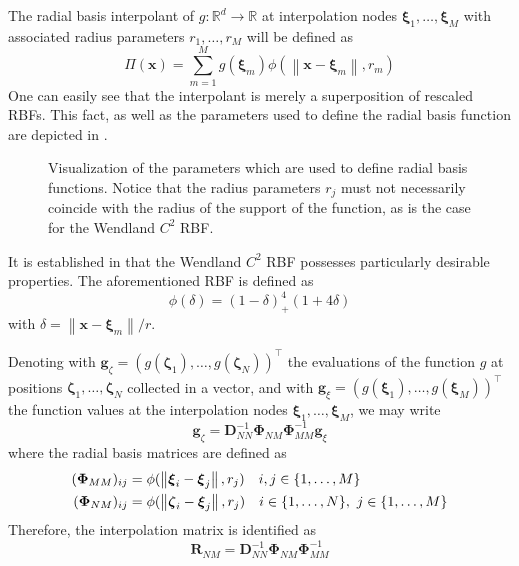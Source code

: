 \documentclass[11pt, a4paper]{article}
\begin{document}
The radial basis interpolant of $g : \mathbb{R}^d \to \mathbb{R}$ at interpolation nodes $\boldsymbol{\xi}_1, \dots, \boldsymbol{\xi}_M$ with associated radius parameters $r_1, \dots, r_M$ will be defined as
\begin{equation}
    \Pi(\mathbf{x}) = \sum_{m=1}^M g(\boldsymbol{\xi}_m) \phi(\left\| \mathbf{x} - \boldsymbol{\xi}_m \right\|, r_m)
\end{equation}
One can easily see that the interpolant is merely a superposition of rescaled RBFs. This fact, as well as the parameters used to define the radial basis function are depicted in .

\begin{figure}[ht]
    \centering
    
    \caption{Visualization of the parameters which are used to define radial basis functions. Notice that the radius parameters $r_j$ must not necessarily coincide with the radius of the support of the function, as is the case for the Wendland $C^2$ RBF.}\label{fig:radialbasis}
\end{figure}

It is established in \cite{voet} that the Wendland $C^2$ RBF possesses particularly desirable properties. The aforementioned RBF is defined as
\begin{equation}
    \phi(\delta) = (1 - \delta)_{+}^4(1 + 4\delta) 
\end{equation}
with $\delta = \left\| \mathbf{x} - \boldsymbol{\xi}_m \right\| / r$.

Denoting with $\mathbf{g}_{\zeta} = (g(\boldsymbol{\zeta}_1), \dots, g(\boldsymbol{\zeta}_N))^{\top}$ the evaluations of the function $g$ at positions $\boldsymbol{\zeta}_1, \dots, \boldsymbol{\zeta}_N$ collected in a vector, and with $\mathbf{g}_{\xi} = (g(\boldsymbol{\xi}_1), \dots, g(\boldsymbol{\xi}_M))^{\top}$ the function values at the interpolation nodes $\boldsymbol{\xi}_1, \dots, \boldsymbol{\xi}_M$, we may write
\begin{equation}
    \mathbf{g}_{\zeta} = \mathbf{D}_{NN}^{-1} \boldsymbol{\Phi}_{NM} \boldsymbol{\Phi}_{MM}^{-1} \mathbf{g}_{\xi}
\end{equation}
where the radial basis matrices are defined as
\begin{align}
    (\boldsymbol{\Phi}_{MM})_{ij} &= \phi(\left\| \boldsymbol{\xi}_i - \boldsymbol{\xi}_j \right\|, r_j) \hspace{10px} i, j \in \{1, \dots, M\} \\
    (\boldsymbol{\Phi}_{NM})_{ij} &= \phi(\left\| \boldsymbol{\zeta}_i - \boldsymbol{\xi}_j \right\|, r_j) \hspace{10px} i \in \{1, \dots, N\},~ j \in \{1, \dots, M\}
\end{align}
Therefore, the interpolation matrix is identified as
\begin{equation}
\mathbf{R}_{NM} = \mathbf{D}_{NN}^{-1} \boldsymbol{\Phi}_{NM} \boldsymbol{\Phi}_{MM}^{-1} \label{equ:interpolation-matrix}
\end{equation}
\end{document}
